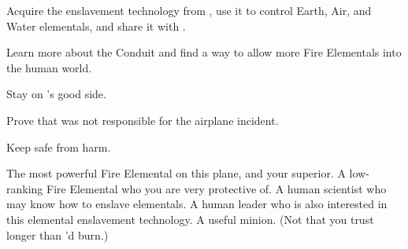 \documentclass[char]{elementals}
\begin{document}
\begin{itemz}[Goals]
  \item Acquire the enslavement technology from \cMS{}, use it to control Earth, Air, and Water elementals, and share it with \cQueen{}.
  \item Learn more about the Conduit and find a way to allow more Fire Elementals into the human world.
  \item Stay on \cQueen{}'s good side.
  \item Prove that \cJuliet{} was not responsible for the airplane incident.
  \item Keep \cJuliet{} safe from harm.
\end{itemz}

\begin{contacts}
  \contact{\cQueen{}}  The most powerful Fire Elemental on this plane, and your superior.
  \contact{\cJuliet{}}  A low-ranking Fire Elemental who you are very protective of.
  \contact{\cMS{}}  A human scientist who may know how to enslave elementals.
  \contact{\cDema{}} A human leader who is also interested in this elemental enslavement technology.  A useful minion.  (Not that you trust \cDema{\them} longer than \cDema{\they}'d burn.)
\end{contacts}
\end{document}
